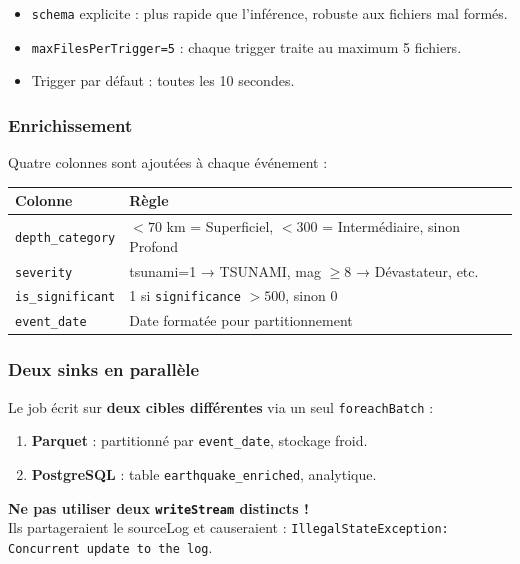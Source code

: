 \documentclass[12pt, a4paper]{article}
\begin{document}
\begin{itemize}
  \item \texttt{schema} explicite : plus rapide que l'inférence, robuste aux fichiers mal formés.
  \item \texttt{maxFilesPerTrigger=5} : chaque trigger traite au maximum 5 fichiers.
  \item Trigger par défaut : toutes les 10 secondes.
\end{itemize}

\subsubsection{Enrichissement}

Quatre colonnes sont ajoutées à chaque événement :

\begin{table}[h]
\centering
\small
\begin{tabular}{|l|l|}
\toprule
\textbf{Colonne} & \textbf{Règle} \\
\midrule
\texttt{depth\_category} & $<70$ km = Superficiel, $<300$ = Intermédiaire, sinon Profond \\
\texttt{severity} & tsunami=1 → TSUNAMI, mag $\geq 8$ → Dévastateur, etc. \\
\texttt{is\_significant} & 1 si \texttt{significance} $> 500$, sinon 0 \\
\texttt{event\_date} & Date formatée pour partitionnement \\
\bottomrule
\end{tabular}
\end{table}

\subsubsection{Deux sinks en parallèle}

Le job écrit sur \textbf{deux cibles différentes} via un seul \texttt{foreachBatch} :

\begin{enumerate}
  \item \textbf{Parquet} : partitionné par \texttt{event\_date}, stockage froid.
  \item \textbf{PostgreSQL} : table \texttt{earthquake\_enriched}, analytique.
\end{enumerate}

\begin{tcolorbox}[colback=yellow!5, title=Important]
  \textbf{Ne pas utiliser deux \texttt{writeStream} distincts !} \\
  Ils partageraient le sourceLog et causeraient : \texttt{IllegalStateException: Concurrent update to the log}.
\end{tcolorbox}
\end{document}
